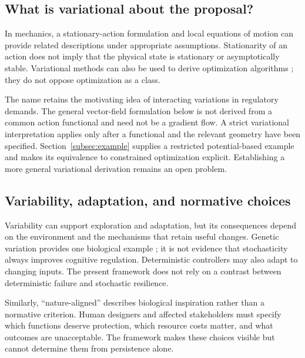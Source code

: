 \subsection{What is variational about the proposal?}
In mechanics, a stationary-action formulation and local equations of motion can provide related descriptions under appropriate assumptions. Stationarity of an action does not imply that the physical state is stationary or asymptotically stable. Variational methods can also be used to derive optimization algorithms \citep{campos2021discrete}; they do not oppose optimization as a class.

The name \uvif{} retains the motivating idea of interacting variations in regulatory demands. The general vector-field formulation below is not derived from a common action functional and need not be a gradient flow. A strict variational interpretation applies only after a functional and the relevant geometry have been specified. Section~\ref{subsec:example} supplies a restricted potential-based example and makes its equivalence to constrained optimization explicit. Establishing a more general variational derivation remains an open problem.

\subsection{Variability, adaptation, and normative choices}
Variability can support exploration and adaptation, but its consequences depend on the environment and the mechanisms that retain useful changes. Genetic variation provides one biological example \citep{barrett2008adaptation}; it is not evidence that stochasticity always improves cognitive regulation. Deterministic controllers may also adapt to changing inputs. The present framework does not rely on a contrast between deterministic failure and stochastic resilience.

Similarly, ``nature-aligned'' describes biological inspiration rather than a normative criterion. Human designers and affected stakeholders must specify which functions deserve protection, which resource costs matter, and what outcomes are unacceptable. The framework makes these choices visible but cannot determine them from persistence alone.
